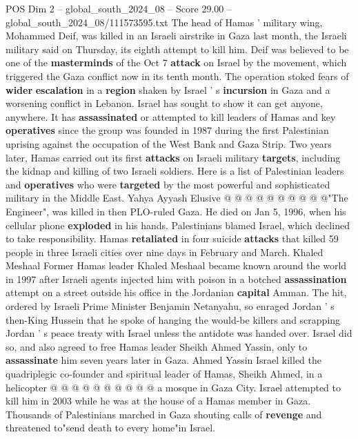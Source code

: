 \begin{textsample}{POS Dim 2 – global\_south\_2024\_08 – Score 29.00 – global\_south\_2024\_08/111573595.txt}  \label{ex:f2_pos_019}
The head of Hamas ' military wing, Mohammed Deif, was killed in an Israeli airstrike in Gaza last month, the Israeli military said on Thursday, its eighth attempt to kill him.
Deif was believed to be one of the \textbf{masterminds} of the Oct 7 \textbf{attack} on Israel by the movement, which triggered the Gaza conflict now in its tenth month.
The operation stoked fears of \textbf{wider} \textbf{escalation} in a \textbf{region} shaken by Israel ' s \textbf{incursion} in Gaza and a worsening conflict in Lebanon.
Israel has sought to show it can get anyone, anywhere.
It has \textbf{assassinated} or attempted to kill leaders of Hamas and key \textbf{operatives} since the group was founded in 1987 during the first Palestinian uprising against the occupation of the West Bank and Gaza Strip.
Two years later, Hamas carried out its first \textbf{attacks} on Israeli military \textbf{targets}, including the kidnap and killing of two Israeli soldiers.
Here is a list of Palestinian leaders and \textbf{operatives} who were \textbf{targeted} by the most powerful and sophisticated military in the Middle East.
Yahya Ayyash Elusive @ @ @ @ @ @ @ @ @ @"The Engineer", was killed in then PLO-ruled Gaza.
He died on Jan 5, 1996, when his cellular phone \textbf{exploded} in his hands.
Palestinians blamed Israel, which declined to take responsibility.
Hamas \textbf{retaliated} in four suicide \textbf{attacks} that killed 59 people in three Israeli cities over nine days in February and March.
Khaled Meshaal Former Hamas leader Khaled Meshaal became known around the world in 1997 after Israeli agents injected him with poison in a botched \textbf{assassination} attempt on a street outside his office in the Jordanian \textbf{capital} Amman.
The hit, ordered by Israeli Prime Minister Benjamin Netanyahu, so enraged Jordan ' s then-King Hussein that he spoke of hanging the would-be killers and scrapping Jordan ' s peace treaty with Israel unless the antidote was handed over.
Israel did so, and also agreed to free Hamas leader Sheikh Ahmed Yassin, only to \textbf{assassinate} him seven years later in Gaza.
Ahmed Yassin Israel killed the quadriplegic co-founder and spiritual leader of Hamas, Sheikh Ahmed, in a helicopter @ @ @ @ @ @ @ @ @ @ a mosque in Gaza City.
Israel attempted to kill him in 2003 while he was at the house of a Hamas member in Gaza.
Thousands of Palestinians marched in Gaza shouting calls of \textbf{revenge} and threatened to"send death to every home"in Israel.

\end{textsample}
